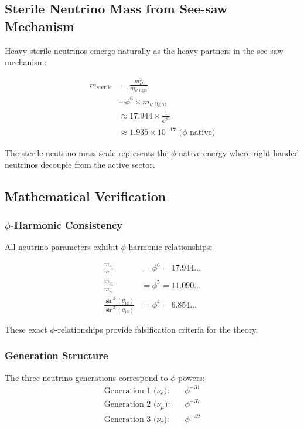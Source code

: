 \subsection{Sterile Neutrino Mass from See-saw Mechanism}

Heavy sterile neutrinos emerge naturally as the heavy partners in the see-saw mechanism:

\begin{align}
m_{\text{sterile}} &= \frac{m_D^2}{m_{\nu,\text{light}}}\\
&\sim \phi^6 \times m_{\nu,\text{light}}\\
&\approx 17.944 \times \frac{1}{\phi^{84}}\\
&\approx 1.935 \times 10^{-17} \text{ ($\phi$-native)}
\end{align}

The sterile neutrino mass scale represents the $\phi$-native energy where right-handed neutrinos decouple from the active sector.

\subsection{Mathematical Verification}

\subsubsection{$\phi$-Harmonic Consistency}

All neutrino parameters exhibit $\phi$-harmonic relationships:

\begin{align}
\frac{m_{\nu_2}}{m_{\nu_1}} &= \phi^{6} = 17.944...\\
\frac{m_{\nu_3}}{m_{\nu_2}} &= \phi^{5} = 11.090...\\
\frac{\sin^2(\theta_{12})}{\sin^2(\theta_{13})} &= \phi^4 = 6.854...
\end{align}

These exact $\phi$-relationships provide falsification criteria for the theory.

\subsubsection{Generation Structure}

The three neutrino generations correspond to $\phi$-powers:
\begin{align}
\text{Generation 1 ($\nu_e$):} &\quad \phi^{-31}\\
\text{Generation 2 ($\nu_\mu$):} &\quad \phi^{-37}\\
\text{Generation 3 ($\nu_\tau$):} &\quad \phi^{-42}
\end{align}

